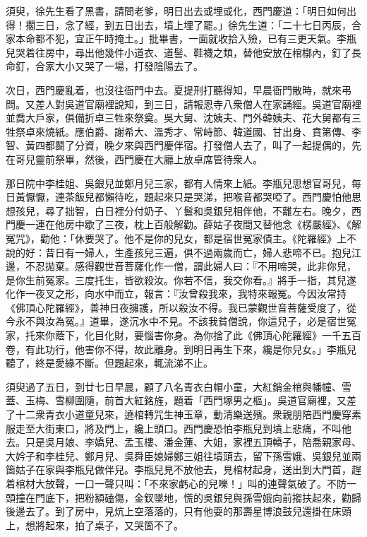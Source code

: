 須臾，徐先生看了黑書，請問老爹，明日出去或埋或化，西門慶道：「明日如何出得！擱三日，念了經，到五日出去，墳上埋了罷。」徐先生道：「二十七日丙辰，合家本命都不犯，宜正午時掩土。」批畢書，一面就收拾入殮，已有三更天氣。李瓶兒哭着往房中，尋出他幾件小道衣、道髻、鞋襪之類，替他安放在棺槨內，釘了長命釘，合家大小又哭了一場，打發陰陽去了。

次日，西門慶亂着，也沒往衙門中去。夏提刑打聽得知，早晨衙門散時，就來弔問。又差人對吳道官廟裡說知，到三日，請報恩寺八衆僧人在家誦經。吳道官廟裡並喬大戶家，俱備折卓三牲來祭奠。吳大舅、沈姨夫、門外韓姨夫、花大舅都有三牲祭卓來燒紙。應伯爵、謝希大、溫秀才、常峙節、韓道國、甘出身、賁第傳、李智、黃四都鬬了分資，晚夕來與西門慶伴宿。打發僧人去了，叫了一起提偶的，先在哥兒靈前祭畢，然後，西門慶在大廳上放卓席管待衆人。

那日院中李桂姐、吳銀兒並鄭月兒三家，都有人情來上紙。李瓶兒思想官哥兒，每日黃懨懨，連茶飯兒都懶待吃，題起來只是哭涕，把喉音都哭啞了。西門慶怕他思想孩兒，尋了拙智，白日裡分付奶子、丫鬟和吳銀兒相伴他，不離左右。晚夕，西門慶一連在他房中歇了三夜，枕上百般解勸。薛姑子夜間又替他念《楞嚴經》、《解冤咒》，勸他：「休要哭了。他不是你的兒女，都是宿世冤家債主。《陀羅經》上不說的好：昔日有一婦人，生產孩兒三遍，俱不過兩歲而亡，婦人悲啼不已。抱兒江邊，不忍拋棄。感得觀世音菩薩化作一僧，謂此婦人曰：『不用啼哭，此非你兒，是你生前冤家。三度托生，皆欲殺汝。你若不信，我交你看。』將手一指，其兒遂化作一夜叉之形，向水中而立，報言：『汝曾殺我來，我特來報冤。今因汝常持《佛頂心陀羅經》，善神日夜擁護，所以殺汝不得。我已蒙觀世音菩薩受度了，從今永不與汝為冤。』道畢，遂沉水中不見。不該我貧僧說，你這兒子，必是宿世冤家，托來你蔭下，化目化財，要惱害你身。為你捨了此《佛頂心陀羅經》一千五百卷，有此功行，他害你不得，故此離身。{}到明日再生下來，纔是你兒女。」{}李瓶兒聽了，終是愛緣不斷。但題起來，輒流涕不止。

須臾過了五日，到廿七日早晨，顧了八名青衣白帽小童，大紅銷金棺與幡幢、雪蓋、玉梅、雪柳圍隨，前首大紅銘旌，題着「西門塚男之樞」。吳道官廟裡，又差了十二衆青衣小道童兒來，遶棺轉咒生神玉章，動清樂送殯。衆親朋陪西門慶穿素服走至大街東口，將及門上，纔上頭口。西門慶恐怕李瓶兒到墳上悲痛，不叫他去。只是吳月娘、李嬌兒、孟玉樓、潘金蓮、大姐，家裡五頂轎子，陪喬親家母、大妗子和李桂兒、鄭月兒、吳舜臣媳婦鄭三姐往墳頭去，留下孫雪娥、吳銀兒並兩箇姑子在家與李瓶兒做伴兒。李瓶兒見不放他去，見棺材起身，送出到大門首，趕着棺材大放聲，一口一聲只叫：「不來家虧心的兒嚛！」叫的連聲氣破了。不防一頭撞在門底下，把粉額磕傷，金釵墜地，慌的吳銀兒與孫雪娥向前搊扶起來，勸歸後邊去了。到了房中，見炕上空落落的，只有他耍的那壽星博浪鼓兒還掛在床頭上，想將起來，{}拍了桌子，又哭箇不了。

